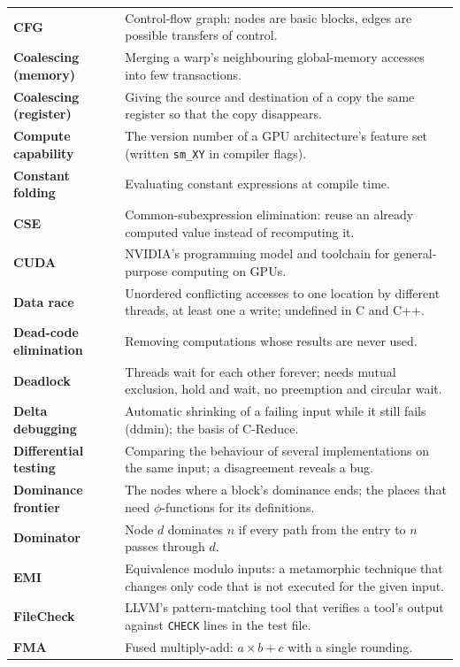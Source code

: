 \documentclass[10pt,a4paper,openany,oneside]{report}
\begin{document}
\begin{center}
\begin{xltabular}{\textwidth}{@{}L{3.6cm}Y@{}}
\textbf{CFG} & Control-flow graph: nodes are basic blocks, edges are possible transfers of control.\\
\textbf{Coalescing (memory)} & Merging a warp's neighbouring global-memory accesses into few transactions.\\
\textbf{Coalescing (register)} & Giving the source and destination of a copy the same register so that the copy disappears.\\
\textbf{Compute capability} & The version number of a GPU architecture's feature set (written \texttt{sm\_XY} in compiler flags).\\
\textbf{Constant folding} & Evaluating constant expressions at compile time.\\
\textbf{CSE} & Common-subexpression elimination: reuse an already computed value instead of recomputing it.\\
\textbf{CUDA} & NVIDIA's programming model and toolchain for general-purpose computing on GPUs.\\
\textbf{Data race} & Unordered conflicting accesses to one location by different threads, at least one a write; undefined in C and C++.\\
\textbf{Dead-code elimination} & Removing computations whose results are never used.\\
\textbf{Deadlock} & Threads wait for each other forever; needs mutual exclusion, hold and wait, no preemption and circular wait.\\
\textbf{Delta debugging} & Automatic shrinking of a failing input while it still fails (ddmin); the basis of C-Reduce.\\
\textbf{Differential testing} & Comparing the behaviour of several implementations on the same input; a disagreement reveals a bug.\\
\textbf{Dominance frontier} & The nodes where a block's dominance ends; the places that need $\phi$-functions for its definitions.\\
\textbf{Dominator} & Node $d$ dominates $n$ if every path from the entry to $n$ passes through $d$.\\
\textbf{EMI} & Equivalence modulo inputs: a metamorphic technique that changes only code that is not executed for the given input.\\
\textbf{FileCheck} & LLVM's pattern-matching tool that verifies a tool's output against \texttt{CHECK} lines in the test file.\\
\textbf{FMA} & Fused multiply-add: $a\times b+c$ with a single rounding.\\

\end{xltabular}
\end{center}
\end{document}
